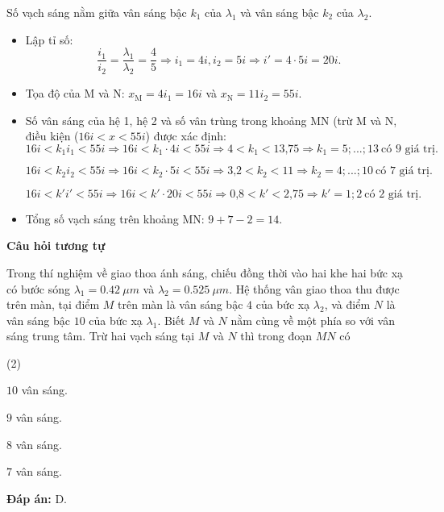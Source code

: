 \begin{dang}{Số vạch sáng nằm giữa vân sáng bậc $k_1$ của $\lambda_1$ và vân sáng bậc $k_2$ của $\lambda_2$.}
{		\begin{itemize}
			\item Lập tỉ số: 
			\begin{equation*}
				\dfrac{i_1}{i_2}=\dfrac{\lambda_1}{\lambda_2}=\dfrac{4}{5} \Rightarrow i_1=4i, i_2=5i \Rightarrow i'=4\cdot 5i=20i.
			\end{equation*}
			\item Tọa độ của M và N: $x_{\text{M}}=4i_1=16i$ và $x_{\text{N}}=11i_2=55i$.
			\item Số vân sáng của hệ 1, hệ 2 và số vân trùng trong khoảng MN (trừ M và N, điều kiện ($16i < x < 55i$) được xác định: 
			\begin{equation*}
				16i < k_1i_1  < 55i \Rightarrow 16i<k_1\cdot 4i<55i \Rightarrow 4<k_1< \text{13,75} \Rightarrow k_1=5;...;13\ \text {có 9 giá trị}.
			\end{equation*}
			
			\begin{equation*}
				16i < k_2i_2  < 55i \Rightarrow 16i<k_2\cdot 5i<55i \Rightarrow \text{3,2}<k_2< 11 \Rightarrow k_2=4;...;10\ \text {có 7 giá trị}.
			\end{equation*}
			
			\begin{equation*}
				16i < k'i'  < 55i \Rightarrow 16i<k'\cdot 20i<55i \Rightarrow \text{0,8}<k'< \text{2,75} \Rightarrow k'=1; 2\ \text {có 2 giá trị}.
			\end{equation*}
			
			\item Tổng số vạch sáng trên khoảng MN: $9+7-2=14$.  
		\end{itemize}
		
		\begin{center}
			\textbf{Câu hỏi tương tự}
		\end{center}
		Trong thí nghiệm về giao thoa ánh sáng, chiếu đồng thời vào hai khe hai bức xạ có bước sóng $ \lambda_{1} = \SI{0,42}{\mu m} $ và $ \lambda_{2} = \SI{0,525}{\mu m} $. Hệ thống vân giao thoa thu được trên màn, tại điểm $ M $ trên màn là vân sáng bậc $ 4 $ của bức xạ $ \lambda_{2} $, và điểm $ N $ là vân sáng bậc $ 10 $ của bức xạ $ \lambda_{1} $. Biết $ M $ và $ N $ nằm cùng về một phía so với vân sáng trung tâm. Trừ hai vạch sáng tại $ M $ và $ N $ thì trong đoạn $ MN $ có
		\begin{mcq}(2)
			\item $ 10 $ vân sáng.
			\item $ 9 $ vân sáng.
			\item $ 8 $ vân sáng.
			\item $ 7 $ vân sáng.
		\end{mcq}
		\textbf{Đáp án:} D.
	}
	

\end{dang}
